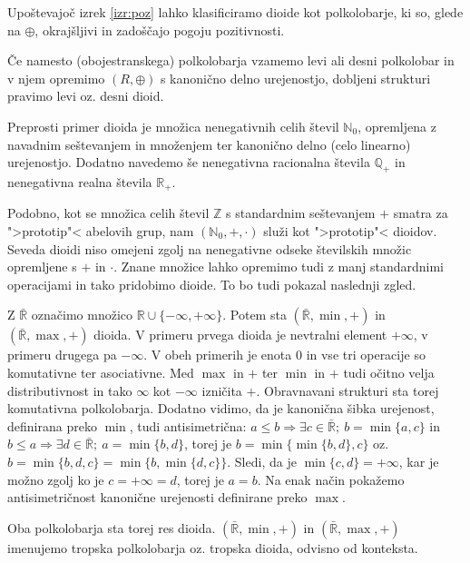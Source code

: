 \documentclass[mat1]{fmfdelo}
\newcommand{\R}{\mathbb{R}}
\newcommand{\N}{\mathbb{N}}
\newcommand{\Z}{\mathbb{Z}}
\newcommand{\No}{\N_0}
\newcommand{\Pplus}[1]{\mathbb{#1}_{+}}
\begin{document}
	Upoštevajoč izrek \ref{izr:poz} lahko klasificiramo dioide kot polkolobarje, ki so, glede na $\oplus$, okrajšljivi in zadoščajo pogoju pozitivnosti.
\begin{opomba}
	Če namesto (obojestranskega) polkolobarja vzamemo levi ali desni polkolobar in v njem opremimo $(R, \oplus)$ s kanonično delno urejenostjo, dobljeni strukturi pravimo levi oz. desni dioid.
\end{opomba}

Preprosti primer dioida je množica nenegativnih celih števil $\No$, opremljena z navadnim seštevanjem in množenjem ter kanonično delno (celo linearno) urejenostjo. Dodatno navedemo še nenegativna racionalna števila $\Pplus{Q}$ in nenegativna realna števila $\Pplus{R}$.

Podobno, kot se množica celih števil $\Z$ s standardnim seštevanjem $+$ smatra za ">prototip"< abelovih grup, nam $(\No, +, \cdot)$ služi kot ">prototip"< dioidov. Seveda dioidi niso omejeni zgolj na nenegativne odseke številskih množic opremljene s $+$ in $\cdot$. Znane množice lahko opremimo tudi z manj standardnimi operacijami in tako pridobimo dioide. To bo tudi pokazal naslednji zgled.

\begin{zgled}\label{zgled:tropdioid}
	Z $\bar{\R}$ označimo množico $\R \cup \{-\infty, +\infty\}$. Potem sta $(\bar{\R}, \min, +)$ in $(\bar{\R}, \max, +)$ dioida. V primeru prvega dioida je nevtralni element $+\infty$, v primeru drugega pa $-\infty$. V obeh primerih je enota $0$ in vse tri operacije so komutativne ter asociativne. Med $\max$ in $+$ ter $\min$ in $+$ tudi očitno velja distributivnost in tako $\infty$ kot $-\infty$ izničita $+$. Obravnavani strukturi sta torej komutativna polkolobarja.
	 Dodatno vidimo, da je kanonična šibka urejenost, definirana preko $\min$, tudi antisimetrična: $a\leq b \Rightarrow \exists c\in \bar{\R};~b = \min\{a, c\}$ in $b\leq a \Rightarrow \exists d\in \bar{\R};~a = \min\{b, d\}$, torej je $b = \min\{\min\{b, d\}, c\}$ oz. $b = \min\{b, d, c\} = \min\{b, \min\{d, c\}\}$. Sledi, da je $\min\{c, d\} = +\infty$, kar je možno zgolj ko je $c = +\infty = d$, torej je $a = b$. Na enak način pokažemo antisimetričnost kanonične urejenosti definirane preko $\max$.

	Oba polkolobarja sta torej res dioida. $(\bar{\R}, \min, +)$ in $(\bar{\R}, \max, +)$ imenujemo tropska polkolobarja oz. tropska dioida, odvisno od konteksta.
\end{zgled}
\end{document}
